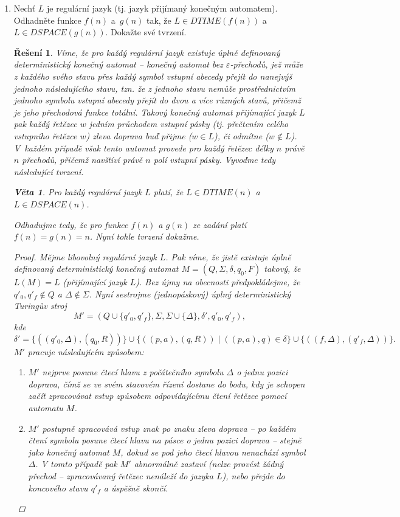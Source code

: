 \documentclass[a4paper]{article}
\let\blank\Delta
\let\var\mathit
\newcommand{\dtime}[1]{\var{DTIME}(#1)}
\newcommand{\dspace}[1]{\var{DSPACE}(#1)}
\theoremstyle{result}
\newtheorem*{result}{Řešení}
\newtheorem*{theorem}{Věta}
\begin{document}
\begin{enumerate}
    \item Nechť $L$ je regulární jazyk (tj. jazyk přijímaný konečným automatem). Odhadněte funkce $f(n)$ a~$g(n)$ tak, že $L \in \dtime{f(n)}$ a $L \in \dspace{g(n)}$. Dokažte své tvrzení.

    \begin{result}
        Víme, že pro každý regulární jazyk existuje úplně definovaný deterministický konečný automat -- konečný automat bez $\varepsilon$-přechodů, jež může z každého svého stavu přes každý symbol vstupní abecedy přejít do nanejvýš jednoho následujícího stavu, tzn. že z jednoho stavu nemůže prostřednictvím jednoho symbolu vstupní abecedy přejít do dvou a více různých stavů, přičemž je jeho přechodová funkce totální. Takový konečný automat přijímající jazyk $L$ pak každý řetězec $w$ jedním průchodem vstupní pásky (tj. přečtením celého vstupního řetězce $w$) zleva doprava buď přijme ($w \in L$), či odmítne ($w \notin L$). V~každém případě však tento automat provede pro každý řetězec délky $n$ právě $n$ přechodů, přičemž navštíví právě $n$ polí vstupní pásky. Vyvoďme tedy následující tvrzení.

        \begin{theorem}
            Pro každý regulární jazyk $L$ platí, že $L \in \dtime{n}$ a $L \in \dspace{n}$.
        \end{theorem}

        Odhadujme tedy, že pro funkce $f(n)$ a $g(n)$ ze zadání platí $f(n) = g(n) = n$. Nyní tohle tvrzení dokažme.

        \begin{proof}
            Mějme libovolný regulární jazyk $L$. Pak víme, že jistě existuje úplně definovaný deterministický konečný automat $M = (Q, \Sigma, \delta, q_0, F)$ takový, že $L(M) = L$ (přijímající jazyk $L$). Bez újmy na obecnosti předpokládejme, že $q'_0, q'_f \notin Q$ a $\blank \notin \Sigma$. Nyní sestrojme (jednopáskový) úplný deterministický Turingův stroj
            $$M' = (Q \cup \{q'_0, q'_f\}, \Sigma, \Sigma \cup \{\blank\}, \delta', q'_0, q'_f),$$
            kde
            $$\delta' = \{((q'_0, \blank), (q_0, R))\} \cup \{((p, a), (q, R)) \mid ((p, a), q) \in \delta\} \cup \{((f, \blank), (q'_f, \blank))\}.$$
            $M'$ pracuje následujícím způsobem:

            \begin{enumerate}[label=\arabic*)]
                \item $M'$ nejprve posune čtecí hlavu z počátečního symbolu $\blank$ o jednu pozici doprava, čímž se ve svém stavovém řízení dostane do bodu, kdy je schopen začít zpracovávat vstup způsobem odpovídajícímu čtení řetězce pomocí automatu $M$.
                \item $M'$ postupně zpracovává vstup znak po znaku zleva doprava -- po každém čtení symbolu posune čtecí hlavu na pásce o jednu pozici doprava -- stejně jako konečný automat $M$, dokud se pod jeho čtecí hlavou nenachází symbol $\blank$. V tomto případě pak $M'$ abnormálně zastaví (nelze provést žádný přechod -- zpracovávaný řetězec nenáleží do jazyka $L$), nebo přejde do koncového stavu $q'_f$ a úspěšně skončí.
            \end{enumerate}


\end{proof}
\end{result}
\end{enumerate}
\end{document}
